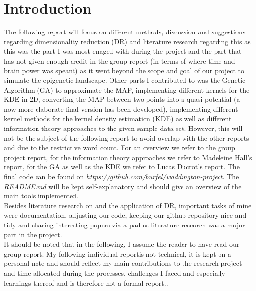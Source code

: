 \documentclass[journal, a4paper]{IEEEtran}
\begin{document}
\section{Introduction}
The following report will focus on different methods, discussion and suggestions regarding dimensionality reduction (DR) and literature research regarding this as this was the part I was most enaged with during the project and the part that has not given enough credit in the group report (in terms of where time and brain power was speant) as it went beyond the scope and goal of our project to simulate the epigenetic landscape.
Other parts I contributed to was the Genetic Algorithm (GA) to approximate the MAP, implementing different kernels for the KDE in 2D, converting the MAP between two points into a quasi-potential (a now more elaborate final version has been developed), implementing different kernel methods for the kernel density estimation (KDE) as well as different information theory approaches to the given sample data set. However, this will not be the subject of the following report to avoid overlap with the other reports and due to the restrictive word count. For an overview we refer to the group project report, for the information theory approaches we refer to Madeleine Hall's report, for the GA as well as the KDE we refer to Lucas Ducrot's report. The final code can be found on 
\textit{\url{https://github.com/burfel/waddington-project.}}
The \textit{README.md} will be kept self-explanatory and should give an overview of the main tools implemented. \\
Besides literature research on and the application of DR, important tasks of mine were documentation, adjusting our code, keeping our github repository nice and tidy and sharing interesting papers via a pad as literature research was a major part in the project. \\

It should be noted that in the following, I assume the reader to have read our group report. My following individual reportis not technical, it is kept on a personal note and should reflect my main contributions to the research project and time allocated during the processes, challenges I faced and especially learnings thereof and is therefore not a formal report.. \\
\end{document}
